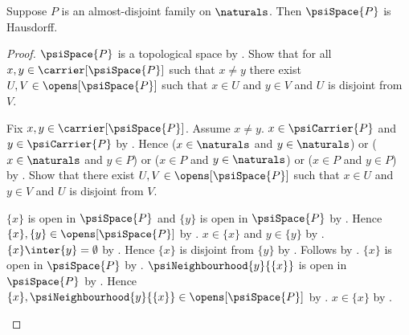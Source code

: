\begin{theorem}\label{psi_space_is_hausdorff}
    Suppose $P$ is an almost-disjoint family on $\naturals$.
    Then $\psiSpace{P}$ is Hausdorff.
\end{theorem}
\begin{proof}
    $\psiSpace{P}$ is a topological space
        by .
    Show that for all $x,y\in\carrier[\psiSpace{P}]$ such that
        $x\neq y$ there exist $U,V\in\opens[\psiSpace{P}]$ such that
        $x\in U$ and $y\in V$ and $U$ is disjoint from $V$.
    \begin{subproof}
        Fix $x,y\in\carrier[\psiSpace{P}]$.
        Assume $x\neq y$.
        $x\in\psiCarrier{P}$ and $y\in\psiCarrier{P}$
            by .
        Hence ($x\in\naturals$ and $y\in\naturals$) or
            ($x\in\naturals$ and $y\in P$) or
            ($x\in P$ and $y\in\naturals$) or
            ($x\in P$ and $y\in P$)
            by .
        Show that there exist $U,V\in\opens[\psiSpace{P}]$ such that
            $x\in U$ and $y\in V$ and $U$ is disjoint from $V$.
        \begin{subproof}
            \begin{byCase}
                    $\{x\}$ is open in $\psiSpace{P}$ and
                        $\{y\}$ is open in $\psiSpace{P}$
                        by .
                    Hence $\{x\},\{y\}\in\opens[\psiSpace{P}]$
                        by .
                    $x\in\{x\}$ and $y\in\{y\}$
                        by .
                    $\{x\}\inter\{y\}=\emptyset$
                        by .
                    Hence $\{x\}$ is disjoint from $\{y\}$
                        by .
                    Follows by \auto.
                    $\{x\}$ is open in $\psiSpace{P}$
                        by .
                    $\psiNeighbourhood{y}{\{x\}}$ is open in
                        $\psiSpace{P}$ by
                        .
                    Hence $\{x\},\psiNeighbourhood{y}{\{x\}}
                        \in\opens[\psiSpace{P}]$ by .
                    $x\in\{x\}$ by .

\end{byCase}
\end{subproof}
\end{subproof}
\end{proof}
